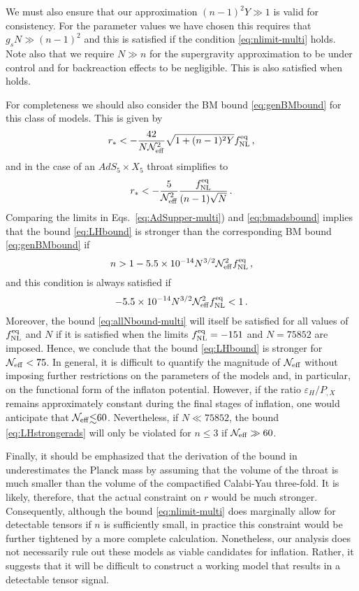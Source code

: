 We must also ensure that our approximation $(n-1)^2Y \gg 1$ 
is valid for consistency.  
For the parameter values we have chosen this requires that 
$g_s N \gg  (n-1)^2$ 
and this is satisfied if the condition \eqref{eq:nlimit-multi} 
holds. Note also that we require $N \gg n$ for the supergravity 
approximation to be under control and for backreaction effects to 
be negligible. This is also satisfied when   
holds. 


For completeness we should also consider the 
BM bound \eqref{eq:genBMbound} for this class of models. This is given by 
% 
\begin{equation}
\label{eq:BMAdS-multi}
r_* < -\frac{42}{N \mathcal{N}_\mathrm{eff}^2}\sqrt{1 +(n-1)^2Y}f_{\mathrm{NL}}^{\mathrm{eq}} \,,
\end{equation}
%  
and in the case of an $AdS_5 \times X_5$ throat simplifies to
%  
\begin{equation}
\label{eq:bmadsbound}
r_* < -\frac{5}{\mathcal{N}_\mathrm{eff}^2} 
\frac{f_{\mathrm{NL}}^{\mathrm{eq}}}{(n-1)\sqrt{N}} \,.
\end{equation}
%  
Comparing the limits in Eqs.~\eqref{eq:AdSupper-multi}) and
\eqref{eq:bmadsbound} 
implies that the bound \eqref{eq:LHbound} is stronger than the corresponding BM
bound \eqref{eq:genBMbound} if 
% 
\begin{equation}
\label{eq:LHstrongerads}
n > 1 -5.5 \times 10^{-14} N^{3/2} \mathcal{N}_\mathrm{eff}^2 f_{\mathrm{NL}}^{\mathrm{eq}} \,,
\end{equation}
% 
and this condition is always satisfied if 
% 
\begin{equation}
\label{eq:allNbound-multi}
-5.5 \times 10^{-14} N^{3/2} \mathcal{N}_\mathrm{eff}^2 f_{\mathrm{NL}}^{\mathrm{eq}}  <1  \, .
\end{equation}
% 
Moreover, the bound \eqref{eq:allNbound-multi} will itself be satisfied for 
all values of $f_{\mathrm{NL}}^{\mathrm{eq}}$ and $N$ if it is satisfied when the limits 
$f_{\mathrm{NL}}^{\mathrm{eq}} =-151$ and $N=75852$ are imposed. Hence, we conclude that the bound
\eqref{eq:LHbound} 
is stronger for $\mathcal{N}_\mathrm{eff} < 75$. 
In general, it is difficult to quantify 
the magnitude of $\mathcal{N}_\mathrm{eff}$ without 
imposing further restrictions on the parameters of the models 
and, in particular, on the functional form of the inflaton potential. 
However, if the ratio $\varepsilon_H/P_{,X}$ remains approximately 
constant during the final stages of inflation, one would anticipate that 
$\Neff \lsim 60$. Nevertheless, if $N \ll 75852$, the bound 
\eqref{eq:LHstrongerads} will only be violated for $n \le 3$ if 
$\mathcal{N}_\mathrm{eff} \gg 60$.  


Finally, it should be emphasized that the derivation of the bound in
underestimates the Planck mass by assuming that 
the volume of the throat is much smaller 
than the volume of the compactified Calabi-Yau 
three-fold. It is likely, therefore, 
that the actual constraint on $r$ would be much stronger. Consequently, 
although the bound \eqref{eq:nlimit-multi}  
does marginally allow for detectable tensors if $n$ is sufficiently 
small, in practice this constraint would be further tightened by a more 
complete calculation. Nonetheless, our analysis does not necessarily 
rule out these models as viable candidates for inflation. Rather, it  
suggests that it will be difficult to construct a working model 
that results in a detectable tensor signal.   


